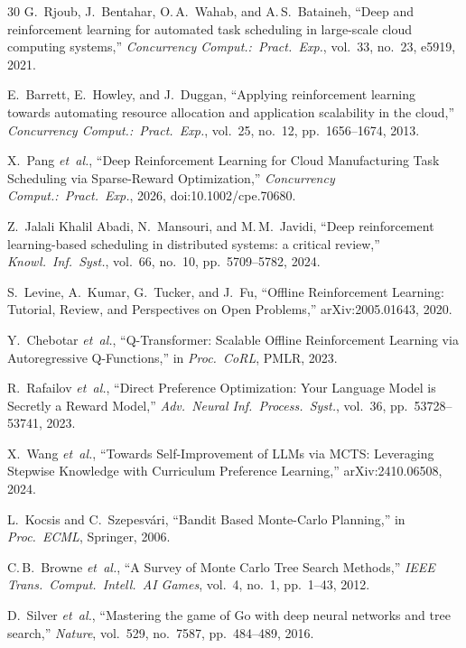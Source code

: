 \documentclass[10pt,journal,compsoc]{IEEEtran}
\begin{document}
\begin{thebibliography}{30}
G.~Rjoub, J.~Bentahar, O.\,A.~Wahab, and A.\,S.~Bataineh,
``Deep and reinforcement learning for automated task scheduling
in large-scale cloud computing systems,''
\emph{Concurrency Comput.:\ Pract.\ Exp.}, vol.~33, no.~23, e5919, 2021.

E.~Barrett, E.~Howley, and J.~Duggan,
``Applying reinforcement learning towards automating resource allocation
and application scalability in the cloud,''
\emph{Concurrency Comput.:\ Pract.\ Exp.}, vol.~25, no.~12,
pp.~1656--1674, 2013.

X.~Pang \emph{et~al.},
``Deep Reinforcement Learning for Cloud Manufacturing Task Scheduling
via Sparse-Reward Optimization,''
\emph{Concurrency Comput.:\ Pract.\ Exp.}, 2026, doi:10.1002/cpe.70680.

Z.~Jalali Khalil Abadi, N.~Mansouri, and M.\,M.~Javidi,
``Deep reinforcement learning-based scheduling in distributed systems:
a critical review,''
\emph{Knowl.\ Inf.\ Syst.}, vol.~66, no.~10, pp.~5709--5782, 2024.

S.~Levine, A.~Kumar, G.~Tucker, and J.~Fu,
``Offline Reinforcement Learning: Tutorial, Review, and Perspectives
on Open Problems,'' arXiv:2005.01643, 2020.

Y.~Chebotar \emph{et~al.},
``Q-Transformer: Scalable Offline Reinforcement Learning via
Autoregressive Q-Functions,''
in \emph{Proc.\ CoRL}, PMLR, 2023.

R.~Rafailov \emph{et~al.},
``Direct Preference Optimization: Your Language Model is Secretly a
Reward Model,''
\emph{Adv.\ Neural Inf.\ Process.\ Syst.}, vol.~36,
pp.~53728--53741, 2023.

X.~Wang \emph{et~al.},
``Towards Self-Improvement of LLMs via MCTS: Leveraging Stepwise
Knowledge with Curriculum Preference Learning,''
arXiv:2410.06508, 2024.

L.~Kocsis and C.~Szepesv\'{a}ri,
``Bandit Based Monte-Carlo Planning,''
in \emph{Proc.\ ECML}, Springer, 2006.

C.\,B.~Browne \emph{et~al.},
``A Survey of Monte Carlo Tree Search Methods,''
\emph{IEEE Trans.\ Comput.\ Intell.\ AI Games},
vol.~4, no.~1, pp.~1--43, 2012.

D.~Silver \emph{et~al.},
``Mastering the game of Go with deep neural networks and tree search,''
\emph{Nature}, vol.~529, no.~7587, pp.~484--489, 2016.


\end{thebibliography}
\end{document}
